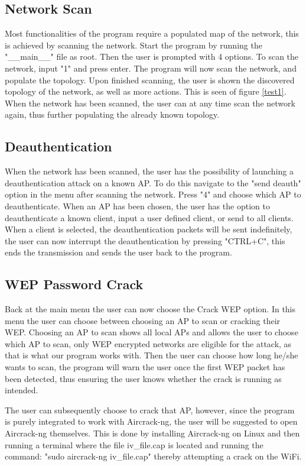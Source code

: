 \subsection{Network Scan}
Most functionalities of the program require a populated map of the network, this is achieved by scanning the network. 
Start the program by running the "\_\_main\_\_" file as root. Then the user is prompted with 4 options.
To scan the network, input "1" and press enter.
The program will now scan the network, and populate the topology.
Upon finished scanning, the user is shown the discovered topology of the network, as well as more actions. This is seen of figure \ref{test1}.
When the network has been scanned, the user can at any time scan the network again, thus further populating the already known topology.
\subsection{Deauthentication}
When the network has been scanned, the user has the possibility of launching a deauthentication attack on a known AP. To do this navigate to the "send deauth" option in the menu after scanning the network.
Press "4" and choose which AP to deauthenticate.
When an AP has been chosen, the user has the option to deauthenticate a known client, input a user defined client, or send to all clients.
When a client is selected, the deauthentication packets will be sent indefinitely, the user can now interrupt the deauthentication by pressing "CTRL+C", this ends the transmission and sends the user back to the program.
\subsection{WEP Password Crack}
Back at the main menu the user can now choose the Crack WEP option. In this menu the user can choose between choosing an AP to scan or cracking their WEP. Choosing an AP to scan shows all local APs and allows the user to choose which AP to scan, only WEP encrypted networks are eligible for the attack, as that is what our program works with. Then the user can choose how long he/she wants to scan, the program will warn the user once the first WEP packet has been detected, thus ensuring the user knows whether the crack is running as intended.

The user can subsequently choose to crack that AP, however, since the program is purely integrated to work with Aircrack-ng, the user will be suggested to open Aircrack-ng themselves. This is done by installing Aircrack-ng on Linux and then running a terminal where the file iv\_file.cap is located and running the command: "sudo aircrack-ng iv\_file.cap" thereby attempting a crack on the WiFi.
